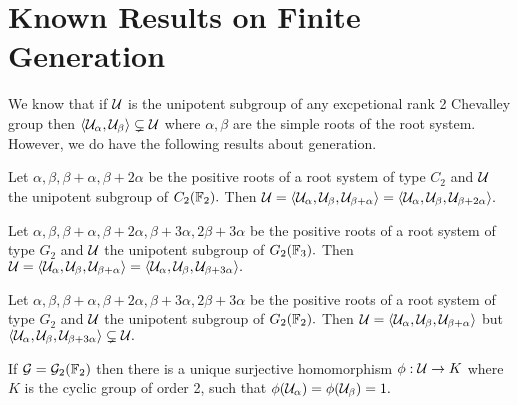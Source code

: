 \documentclass[class=book, crop=false,12 pt]{standalone}
\begin{document}
\chapter{Known Results on Finite Generation}

We know that if $\mathcal{U}$ is the unipotent subgroup of any excpetional rank 2 Chevalley group then $\langle \mathcal{U}_\alpha,\mathcal{U}_\beta\rangle\subsetneq \mathcal{U}$ where $\alpha,\beta$ are the simple roots of the root system. However, we do have the following results about generation. 

\begin{lemma} Let $\alpha,\beta,\beta+\alpha,\beta+2\alpha$ be the positive roots of a root system of type $C_2$ and $\mathcal{U}$ the unipotent subgroup of $C_2(\mathbb{F}_{2}).$ Then $\mathcal{U}=\langle \mathcal{U}_\alpha,\mathcal{U}_\beta,\mathcal{U}_{\beta+\alpha}\rangle=\langle \mathcal{U}_\alpha,\mathcal{U}_\beta,\mathcal{U}_{\beta+2\alpha}\rangle.$
	\label{c2f2gen}
\end{lemma}

\begin{lemma}
	\label{g2f3gen}
Let $\alpha,\beta,\beta+\alpha,\beta+2\alpha,\beta+3\alpha,2\beta+3\alpha$ be the positive roots of a root system of type $G_2$ and $\mathcal{U}$ the unipotent subgroup of $G_2(\mathbb{F}_{3}).$ Then $\mathcal{U}=\langle \mathcal{U}_\alpha,\mathcal{U}_\beta,\mathcal{U}_{\beta+\alpha}\rangle=\langle \mathcal{U}_\alpha,\mathcal{U}_\beta,\mathcal{U}_{\beta+3\alpha}\rangle.$
\end{lemma}

\begin{lemma}
	\label{g2f2gen}
	Let $\alpha,\beta,\beta+\alpha,\beta+2\alpha,\beta+3\alpha,2\beta+3\alpha$ be the positive roots of a root system of type $G_2$ and $\mathcal{U}$ the unipotent subgroup of $G_2(\mathbb{F}_{2}).$ Then $\mathcal{U}=\langle \mathcal{U}_\alpha,\mathcal{U}_\beta,\mathcal{U}_{\beta+\alpha}\rangle$ but $\langle \mathcal{U}_\alpha,\mathcal{U}_\beta,\mathcal{U}_{\beta+3\alpha}\rangle\subsetneq \mathcal{U}.$
\end{lemma}

\begin{lemma}
	\label{g2f2unique}
	If $\mathcal{G}=\mathcal{G}_2(\mathbb{F}_{2})$ then there is a unique surjective homomorphism $\phi:\mathcal{U}\to K$ where $K$ is the cyclic group of order 2, such that $\phi(\mathcal{U}_\alpha)=\phi(\mathcal{U}_\beta)=1.$
\end{lemma}
\end{document}
